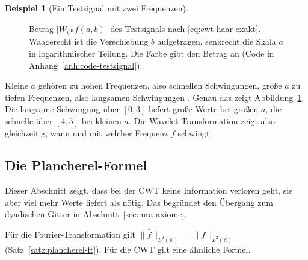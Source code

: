 \documentclass[a4paper,11pt,bibliography=totoc,listof=totoc,headinclude=true,cleardoublepage=empty,oneside]{scrbook}
\theoremstyle{plain}
\theoremstyle{definition}
\newtheorem{Beispiel}[Satz]{Beispiel}
\newcommand{\R}{\mathbb{R}}
\newcommand{\LZwei}{L^2(\R)}
\newcommand{\norm}[1]{\lVert #1 \rVert}
\begin{document}
\begin{Beispiel}[Ein Testsignal mit zwei Frequenzen]
\begin{figure}[htbp]
  \centering
  \caption[Haar-Wavelet-Transformierte des Testsignals]{Betrag
  $\lvert W_{\psi^{\mathrm H}}f(a,b)\rvert$ des Testsignals nach
  \eqref{eq:cwt-haar-exakt}. Waagerecht ist die Verschiebung $b$ aufgetragen,
  senkrecht die Skala $a$ in logarithmischer Teilung. Die Farbe gibt den
  Betrag an (Code in Anhang~\ref{anh:code-testsignal}).}
  \label{fig:cwt}
\end{figure}

Kleine $a$ gehören zu hohen Frequenzen, also schnellen Schwingungen, gro\ss{}e
$a$ zu tiefen Frequenzen, also langsamen Schwingungen \cite[Kap.~1.5]{blatter}. %
Genau das zeigt Abbildung~\ref{fig:cwt}. Die langsame Schwingung über $[0,3]$
liefert gro\ss{}e Werte bei gro\ss{}en $a$, die schnelle über $[4,5]$ bei
kleinen $a$. Die Wavelet-Transformation zeigt also gleichzeitig, wann und mit
welcher Frequenz $f$ schwingt.
\end{Beispiel}
 
\subsection{Die Plancherel-Formel}
\label{subsec:plancherel}

Dieser Abschnitt zeigt, dass bei der CWT keine Information verloren geht, sie
aber viel mehr Werte liefert als nötig. Das begründet den Übergang zum
dyadischen Gitter in Abschnitt~\ref{sec:mra-axiome}.

Für die Fourier-Transformation gilt $\norm{\hat f}_{\LZwei} = \norm{f}_{\LZwei}$
(Satz~\ref{satz:plancherel-ft}). Für die CWT gilt eine ähnliche Formel.
\end{document}
